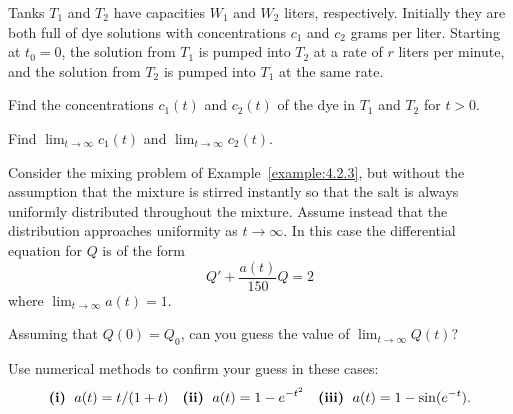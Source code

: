 \begin{exerciselist}
  \item\label{exer:4.2.21} Tanks $T_{1}$ and $T_{2}$ have capacities $W_{1}$ and $W_{2}$ liters,
        respectively. Initially they are both full of dye solutions with concentrations $c_{1}$ and
        $c_{2}$ grams per liter. Starting at $t_{0}=0$, the solution from $T_{1}$ is pumped into
        $T_{2}$ at a rate of $r$ liters per minute, and the solution from $T_{2}$ is pumped into
        $T_{1}$ at the same rate.

  \begin{alist}
    \item %
    Find the concentrations $c_{1}(t)$ and $c_{2}(t)$ of the dye in $T_{1}$ and $T_{2}$ for $t>0$.

    \item %
    Find $\lim_{t\to\infty}c_{1}(t)$ and $\lim_{t\to\infty}c_{2}(t)$.
  \end{alist}

  \item\label{exer:4.2.22} \Lex Consider the mixing problem of Example~\ref{example:4.2.3}, but
        without the assumption that the mixture is stirred instantly so that the salt is always
        uniformly distributed throughout the mixture. Assume instead that the distribution
        approaches uniformity as $t\to\infty$. In this case the differential equation for $Q$ is of
        the form
  \[
    Q'+\frac{a(t)}{150}Q=2
  \]
  where $\lim_{t\to\infty}a(t)=1$.
  \begin{alist}
    \item %
    Assuming that $Q(0)=Q_{0}$, can you guess the value of $\lim_{t\to\infty}Q(t)$?

    \item %
    Use numerical methods to confirm your guess in these cases:
    \[
      \mbox{{\bf (i)}\; }a(t)=t/(1+t)\mbox{\quad {\bf (ii)}\; }a(t)=1-e^{-t^{2}}\mbox{\quad {\bf (iii)}\; }a(t)=1-\sin(e^{-t}).
    \]
  \end{alist}


\end{exerciselist}
